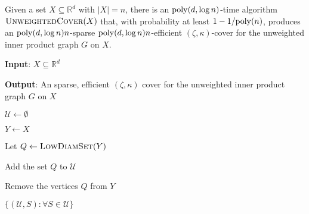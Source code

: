 \begin{proposition}\label{prop:unweighted-cover}
Given a set $X\subseteq \mathbb{R}^d$ with $|X| = n$, there is an $\mathrm{poly}(d,\log n)$-time algorithm $\textsc{UnweightedCover}(X)$ that, with probability at least $1 - 1/\mathrm{poly}(n)$, produces an $\mathrm{poly}(d,\log n) n$-sparse $\mathrm{poly}(d,\log n) n$-efficient $(\zeta,\kappa)$-cover for the unweighted inner product graph $G$ on $X$.
\end{proposition}

\begin{algorithm}[!h]\caption{}
\begin{algorithmic}[1]

    \State \textbf{Input}: $X\subseteq \mathbb{R}^d$
    
    \State \textbf{Output}: An sparse, efficient $(\zeta,\kappa)$ cover for the unweighted inner product graph $G$ on $X$
    
    \State $\mathcal U \gets \emptyset$
    
    \State $Y\gets X$
    
     
    
        \State Let $Q\gets \textsc{LowDiamSet}(Y)$
    
        \State Add the set $Q$ to $\mathcal U$
        
        \State Remove the vertices $Q$ from $Y$
        
    \EndWhile
    
    \State \Return $\{(\mathcal U, S): \forall S\in \mathcal U\}$
    
\EndProcedure
\end{algorithmic}
\end{algorithm}

